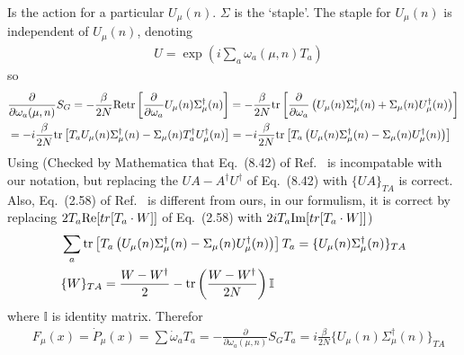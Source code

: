 Is the action for a particular $U_{\mu}(n)$. $\Sigma$ is the `staple'. The staple for $U_{\mu}(n)$ is independent of $U_{\mu}(n)$, denoting
\begin{equation}
\begin{split}
&U=\exp \left(i \sum _a\omega _a(\mu,n) T_a\right)
\end{split}
\end{equation}
so
\begin{equation}
\begin{split}
&\frac{\partial}{\partial \omega _a (\mu,n)}S_G=-\frac{\beta}{2N}{\rm Re}{\rm tr}\left[\frac{\partial}{\partial \omega _a}U_{\mu}(n)\Sigma ^{\dagger}_{\mu}(n)\right]=-\frac{\beta}{2N}{\rm tr}\left[\frac{\partial}{\partial \omega _a}\left(U_{\mu}(n)\Sigma ^{\dagger}_{\mu}(n)+\Sigma _{\mu}(n)U^{\dagger}_{\mu}(n)\right)\right]\\
&=-i\frac{\beta}{2N}{\rm tr}\left[T_aU_{\mu}(n)\Sigma ^{\dagger}_{\mu}(n)-\Sigma _{\mu}(n)T^{\dagger}_aU^{\dagger}_{\mu}(n)\right]=-i\frac{\beta}{2N}{\rm tr}\left[T_a\left(U_{\mu}(n)\Sigma ^{\dagger}_{\mu}(n)-\Sigma _{\mu}(n)U^{\dagger}_{\mu}(n)\right)\right]\\
\end{split}
\end{equation}
Using \textcolor[rgb]{0,0,1}{(Checked by Mathematica that Eq.~(8.42) of Ref.~\cite{latticeqcdbook2010} is incompatable with our notation, but replacing the $UA-A^{\dagger}U^{\dagger}$ of Eq.~(8.42) with $\{UA\}_{TA}$ is correct. Also, Eq.~(2.58) of Ref.~\cite{latticeqcdbook2017} is different from ours, in our formulism, it is correct by replacing $2T_a{\rm Re}[tr[T_a\cdot W]]$ of Eq.~(2.58) with $2iT_a{\rm Im}[tr[T_a\cdot W]]$)}
\begin{equation}
\begin{split}
&\sum _a {\rm tr}\left[T_a\left(U_{\mu}(n)\Sigma ^{\dagger}_{\mu}(n)-\Sigma _{\mu}(n)U^{\dagger}_{\mu}(n)\right)\right]T_a=\{U_{\mu}(n)\Sigma ^{\dagger}_{\mu}(n)\}_{TA}\\
&\{W\}_{TA}=\frac{W-W^{\dagger}}{2}-{\rm tr}\left(\frac{W-W^{\dagger}}{2N}\right)\mathbb{I}\\
\end{split}
\end{equation}
where $\mathbb{I}$ is identity matrix. Therefor
\begin{equation}
\begin{split}
&F_{\mu}(x)=\dot{P}_{\mu}(x)=\sum \dot{\omega}_a T_a=-\frac{\partial}{\partial \omega _a (\mu,n)}S_G T_a=i\frac{\beta}{2N}\{U_{\mu}(n)\Sigma ^{\dagger}_{\mu}(n)\}_{TA}\\
\end{split}
\label{eq.hmc.force}
\end{equation}

